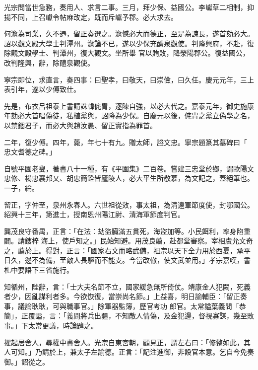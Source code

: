 \begin{pinyinscope}
 光宗問當世急務，奏用人、求言二事。三月，拜少保、益國公。李巘草二相制，抑揚不同，上召巘令帖麻改定，既而斥巘予郡。必大求去。



 何澹為司業，久不遷，留正奏選之。澹憾必大而德正，至是為諫長，遂首劾必大。詔以觀文殿大學士判潭州。澹論不已，遂以少保充醴泉觀使。判隆興府，不赴，復除觀文殿學士、判潭州，復大觀文。坐所舉
 官以賄敗，降滎陽郡公。復益國公，改判隆興，辭，除醴泉觀使。



 寧宗即位，求直言，奏四事：曰聖孝，曰敬天，曰崇儉，曰久任。慶元元年，三上表引年，遂以少傅致仕。



 先是，布衣呂祖泰上書請誅韓侂胄，逐陳自強，以必大代之。嘉泰元年，御史施康年劾必大首唱偽徒，私植黨與，詔降為少保。自慶元以後，侂胄之黨立偽學之名，以禁錮君子，而必大與趙汝愚、留正實指為罪首。



 二年，復少傅。四年，薨，年七十有九。贈太師，謚文忠。寧宗題篆其墓碑曰「
 忠文耆德之碑。」



 自號平園老叟，著書八十一種，有《平園集》二百卷。嘗建三忠堂於鄉，謂歐陽文忠修、楊忠襄邦乂、胡忠簡銓皆廬陵人，必大平生所敬慕，為文記之，蓋絕筆也。一子，綸。



 留正，字仲至，泉州永春人。六世祖從效，事太祖，為清遠軍節度使，封鄂國公。紹興十三年，第進士，授南恩州陽江尉、清海軍節度判官。



 龔茂良守番禺，正言：「在法：劫盜臟滿五貫死，海盜加等。小民餌利，率身陷重闢。請鏤梓
 海上，使戶知之。」民始知避。用茂良薦，赴都堂審察。宰相虞允文奇之，薦於上。得對，正言：「國家右文而略武備，祖宗以天下全力用於西夏，承平日久，邊不為備，至敵人長驅而不能支。今當改轍，使文武並用。」孝宗嘉嘆，書札中要語下三省施行。



 知循州，陛辭，言：「士大夫名節不立，國家緩急無所倚仗。靖康金人犯闕，死義者少，因亂謀利者多。今欲恢復，當崇尚名節。」上益喜，明日諭輔臣：「留正奏事，議論耿耿，可與職事官。」除軍器監簿，歷官考功
 郎官。太常謚葉義問「恭簡」，正覆謚，言：「義問將兵出疆，不知敵人情偽，及金犯邊，督視寡謀，幾至敗事。」下太常更議，時論韙之。



 擢起居舍人，尋權中書舍人。光宗自東宮朝，顧見正，謂左右曰：「修整如此，其人可知。」乃請於上，兼太子左諭德。正言：「記注進御，非設官本意。乞自今免奏御。」詔從之。




\end{pinyinscope}
